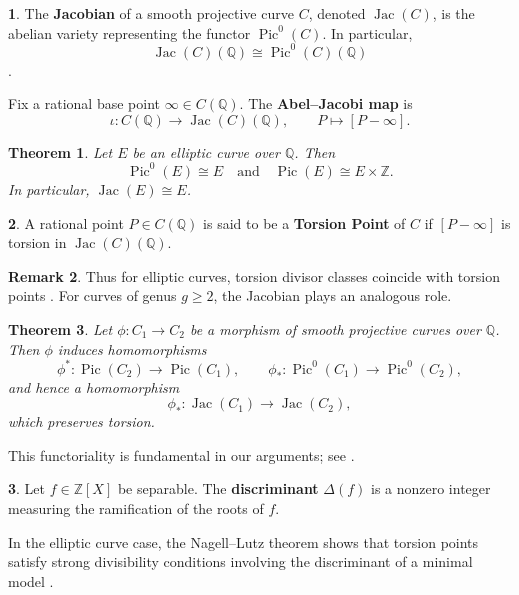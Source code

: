 \documentclass[12pt, reqno]{amsart}
\DeclareMathOperator{\Pic}{Pic}
\newtheorem{thm}{Theorem}[section]
\numberwithin{equation}{section}
\theoremstyle{definition}
\newtheorem{remark}[thm]{Remark}
\theoremstyle{nodefstyle}
\newtheorem*{define}{}
\newcommand{\Jac}{\operatorname{Jac}}
\begin{document}
\begin{define}
The \textbf{Jacobian} of a smooth projective curve $C$, denoted $\Jac(C)$, is the abelian
variety representing the functor $\Pic^0(C)$. In particular,
\[
\Jac(C)(\mathbb{Q}) \cong \Pic^0(C)(\mathbb{Q})
\]
\cite[Chapter~III]{Silverman1994}.
\end{define}

Fix a rational base point $\infty \in C(\mathbb{Q})$.
The \textbf{Abel--Jacobi map} is
\[
\iota : C(\mathbb{Q}) \longrightarrow \Jac(C)(\mathbb{Q}),
\qquad
P \longmapsto [P-\infty].
\]

\begin{thm}
Let $E$ be an elliptic curve over $\mathbb{Q}$. Then
\[
\Pic^0(E) \cong E
\quad\text{and}\quad
\Pic(E) \cong E \times \mathbb{Z}.
\]
In particular, $\Jac(E) \cong E$.
\end{thm}
\begin{define}
A rational point $P \in C(\mathbb{Q})$ is said to be a \textbf{Torsion Point} of $C$ if $[P-\infty]$ is torsion in $\Jac(C)(\mathbb{Q})$.    
\end{define}
\begin{remark}
Thus for elliptic curves, torsion divisor classes coincide with torsion points
\cite[Chapter~III]{Silverman1986}. For curves of genus $g \ge 2$, the Jacobian plays an
analogous role.
\end{remark}



\begin{thm}
Let $\phi : C_1 \to C_2$ be a morphism of smooth projective curves over $\mathbb{Q}$.
Then $\phi$ induces homomorphisms
\[
\phi^\ast : \Pic(C_2) \to \Pic(C_1),
\qquad
\phi_\ast : \Pic^0(C_1) \to \Pic^0(C_2),
\]
and hence a homomorphism
\[
\phi_\ast : \Jac(C_1) \longrightarrow \Jac(C_2),
\]
which preserves torsion.
\end{thm}

This functoriality is fundamental in our arguments; see \cite[\S5]{Mumford1970}.



\begin{define}
Let $f \in \mathbb{Z}[X]$ be separable. The \textbf{discriminant} $\Delta(f)$ is a nonzero
integer measuring the ramification of the roots of $f$.
\end{define}

In the elliptic curve case, the Nagell--Lutz theorem shows that torsion points satisfy strong
divisibility conditions involving the discriminant of a minimal model
\cite[Chapter~III]{Silverman1986}.
\end{document}
